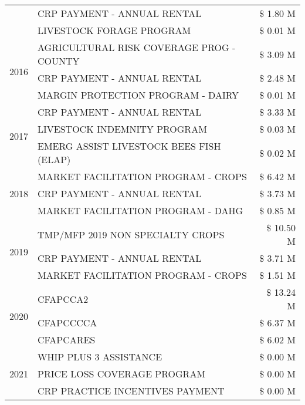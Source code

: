 \begin{tabular}{llr}
 & CRP PAYMENT - ANNUAL RENTAL & \$ 1.80 M \\
 & LIVESTOCK FORAGE PROGRAM & \$ 0.01 M \\
\cline{1-3}
\multirow[t]{3}{*}{2016} & AGRICULTURAL RISK COVERAGE PROG - COUNTY & \$ 3.09 M \\
 & CRP PAYMENT - ANNUAL RENTAL & \$ 2.48 M \\
 & MARGIN PROTECTION PROGRAM - DAIRY & \$ 0.01 M \\
\cline{1-3}
\multirow[t]{3}{*}{2017} & CRP PAYMENT - ANNUAL RENTAL & \$ 3.33 M \\
 & LIVESTOCK INDEMNITY PROGRAM & \$ 0.03 M \\
 & EMERG ASSIST LIVESTOCK BEES FISH (ELAP) & \$ 0.02 M \\
\cline{1-3}
\multirow[t]{3}{*}{2018} & MARKET FACILITATION PROGRAM - CROPS & \$ 6.42 M \\
 & CRP PAYMENT - ANNUAL RENTAL & \$ 3.73 M \\
 & MARKET FACILITATION PROGRAM - DAHG & \$ 0.85 M \\
\cline{1-3}
\multirow[t]{3}{*}{2019} & TMP/MFP 2019 NON SPECIALTY CROPS & \$ 10.50 M \\
 & CRP PAYMENT - ANNUAL RENTAL & \$ 3.71 M \\
 & MARKET FACILITATION PROGRAM - CROPS & \$ 1.51 M \\
\cline{1-3}
\multirow[t]{3}{*}{2020} & CFAPCCA2 & \$ 13.24 M \\
 & CFAPCCCCA & \$ 6.37 M \\
 & CFAPCARES & \$ 6.02 M \\
\cline{1-3}
\multirow[t]{3}{*}{2021} & WHIP PLUS 3 ASSISTANCE & \$ 0.00 M \\
 & PRICE LOSS COVERAGE PROGRAM & \$ 0.00 M \\
 & CRP PRACTICE INCENTIVES PAYMENT & \$ 0.00 M \\
\cline{1-3}
\bottomrule
\end{tabular}
